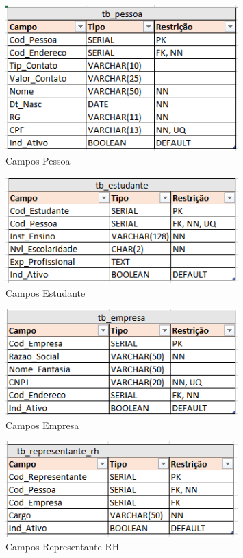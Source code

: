 \begin{figure}[H]
	\centering 
	\caption{\label{fig:dicio-person}Campos Pessoa}
	\includegraphics[width=0.8\textwidth]{../imagens/dicio-tb-pessoa.png} 
\end{figure}

\begin{figure}[H]
	\centering 
	\caption{\label{fig:dicio-student}Campos Estudante}
	\includegraphics[width=0.8\textwidth]{../imagens/dicio-tb-estudante.png} 
\end{figure}

\begin{figure}[H]
	\centering 
	\caption{\label{fig:dicio-company}Campos Empresa}
	\includegraphics[width=0.8\textwidth]{../imagens/dicio-tb-empresa.png} 
\end{figure}

\begin{figure}[H]
	\centering 
	\caption{\label{fig:dicio-rh}Campos Representante RH}
	\includegraphics[width=0.8\textwidth]{../imagens/dicio-tb-representante-rh.png}
\end{figure}


